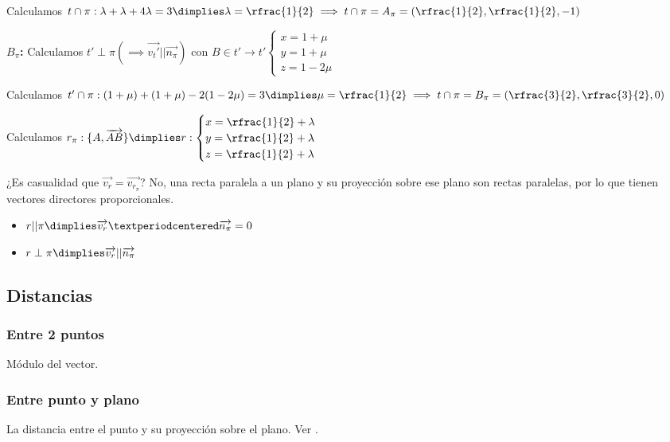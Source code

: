 \begin{problem}
\begin{enumerate}
  Calculamos $t\cap\pi: \lambda+\lambda+4\lambda=3\dimplies \lambda=\rfrac{1}{2} \implies t\cap\pi =A_{\pi}=\left(\rfrac{1}{2},\rfrac{1}{2},-1\right)$

  \textbf{$B_{\pi}$:} Calculamos $t'\perp\pi (\implies \vec{v_t'}||\vec{n_{\pi}})$ con $B\in t'\to t'\begin{cases}x=1+\mu\\y=1+\mu\\z=1-2\mu\end{cases}$

  Calculamos $t'\cap\pi: (1+\mu)+(1+\mu)-2(1-2\mu)=3\dimplies \mu=\rfrac{1}{2} \implies t\cap\pi =B_{\pi}=\left(\rfrac{3}{2},\rfrac{3}{2},0\right)$

  Calculamos $r_{\pi}:\{A,\vec{AB}\} \dimplies r:\begin{cases}x=\rfrac{1}{2}+\lambda\\y=\rfrac{1}{2}+\lambda\\z=\rfrac{1}{2}+\lambda\end{cases}$

\obs ¿Es casualidad que $\vec{v_r} = \vec{v_{r_{\pi}}}$? No, una recta paralela a un plano y su proyección sobre ese plano son rectas paralelas, por lo que tienen vectores directores proporcionales.
\end{enumerate}

\end{problem}


\begin{itemize}
  \item $r || \pi \dimplies \vec{v_r}·\vec{n_{\pi}} = 0$
  \item $r\perp \pi \dimplies \vec{v_r}||\vec{n_{\pi}}$
\end{itemize}

\subsection{Distancias}
\subsubsection{Entre 2 puntos}
Módulo del vector.

\subsubsection{Entre punto y plano}

La distancia entre el punto y su proyección sobre el plano. Ver .


